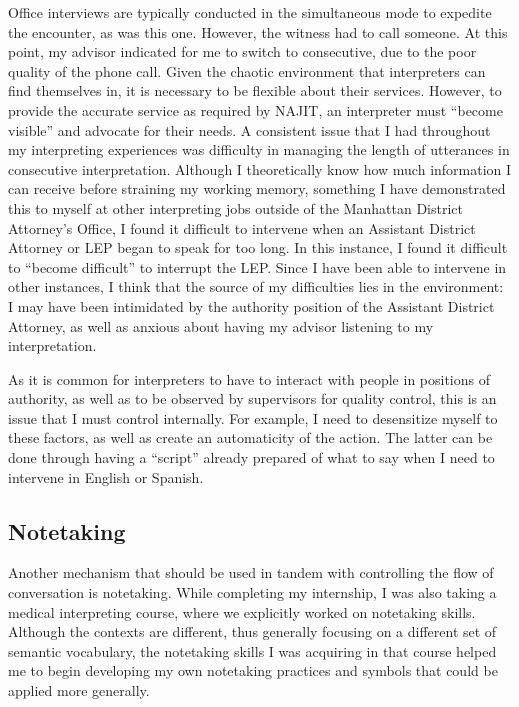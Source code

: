 \documentclass{article}
\begin{document}
Office interviews are typically conducted in the simultaneous mode to expedite the encounter, as was this one. However, the witness had to call someone. At this point, my advisor indicated for me to switch to consecutive, due to the poor quality of the phone call. Given the chaotic environment that interpreters can find themselves in, it is necessary to be flexible about their services. However, to provide the accurate service as required by NAJIT, an interpreter must “become visible” and advocate for their needs. A consistent issue that I had throughout my interpreting experiences was difficulty in managing the length of utterances in consecutive interpretation. Although I theoretically know how much information I can receive before straining my working memory, something I have demonstrated this to myself at other interpreting jobs outside of the Manhattan District Attorney’s Office, I found it difficult to intervene when an Assistant District Attorney or LEP began to speak for too long. In this instance, I found it difficult to “become difficult” to interrupt the LEP. Since I have been able to intervene in other instances, I think that the source of my difficulties lies in the environment: I may have been intimidated by the authority position of the Assistant District Attorney, as well as anxious about having my advisor listening to my interpretation. 

As it is common for interpreters to have to interact with people in positions of authority, as well as to be observed by supervisors for quality control, this is an issue that I must control internally. For example, I need to desensitize myself to these factors, as well as create an automaticity of the action. The latter can be done through having a “script” already prepared of what to say when I need to intervene in English or Spanish.

\subsection{Notetaking}

Another mechanism that should be used in tandem with controlling the flow of conversation is notetaking. While completing my internship, I was also taking a medical interpreting course, where we explicitly worked on notetaking skills. Although the contexts are different, thus generally focusing on a different set of semantic vocabulary, the notetaking skills I was acquiring in that course helped me to begin developing my own notetaking practices and symbols that could be applied more generally. 
\end{document}
